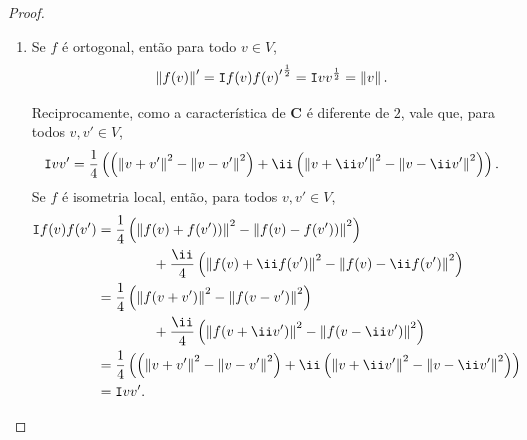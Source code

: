 \begin{proof}
	\begin{enumerate}
	\item Se $f$ é ortogonal, então para todo $v \in V$,
	\begin{equation*}
	\left\Vert{f(v)}\right\Vert' = {\mathtt I{f(v)}{f(v)}'}^\frac{1}{2} = {\mathtt I{v}{v}}^\frac{1}{2} = \left\Vert{v}\right\Vert.
	\end{equation*}
	
Reciprocamente, como a característica de $\bm C$ é diferente de $2$, vale que, para todos $v,v' \in V$,		
		\begin{equation*}
		\inte{v}{v'} = \frac{1}{4} \left( \left(\nor{v+v'}^2 - \nor{v-v'}^2\right) + \ii \left(\nor{v+\ii v'}^2 - \nor{v-\ii v'}^2\right) \right).
		\end{equation*}
Se $f$ é isometria local, então, para todos $v,v' \in V$,
	\begin{align*}
		\inte{f(v)}{f(v')} 	&= \frac{1}{4}\left(\nor{f(v)+f(v'))}^2 - \nor{f(v)-f(v'))}^2\right) \\
		&\qquad\qquad + \frac{\ii}{4} \left(\nor{f(v)+\ii f(v')}^2 - \nor{f(v)-\ii f(v')}^2\right) \\
		&= \frac{1}{4}\left(\nor{f(v+v')}^2 - \nor{f(v-v')}^2\right) \\
		&\qquad\qquad + \frac{\ii}{4}\left(\nor{f(v+\ii v')}^2 - \nor{f(v-\ii v')}^2\right) \ \\
		&= \frac{1}{4} \left( \left(\nor{v+v'}^2 - \nor{v-v'}^2\right) + \ii \left(\nor{v+\ii v'}^2 - \nor{v-\ii v'}^2\right) \right) \\
		&= \inte{v}{v'}.
	\end{align*}
	

	
	

\end{enumerate}
\end{proof}
